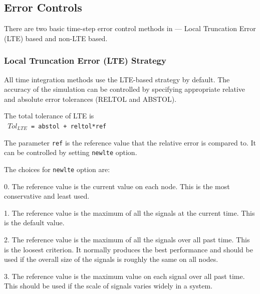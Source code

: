 \subsection{Error Controls}
\label{Time_Step_Selection}
  

There are two basic  time-step error control methods in \Xyce{} --- Local
Truncation Error (LTE) based and non-LTE based.  


\subsubsection{Local Truncation Error (LTE) Strategy}
 
All time integration methods use the LTE-based strategy by default. The
accuracy of the simulation can be controlled by specifying appropriate relative
and absolute error tolerances (RELTOL and ABSTOL).


The total tolerance of LTE is
{\\
\texttt{ $Tol_{LTE}$  = abstol +  reltol*ref}  
}

The parameter \verb|ref| is the reference value that the relative error is compared to. It can be controlled by setting \verb|newlte| option.

The  choices for \verb|newlte| option are:

\begin{XyceItemize} 
\item 0. The reference value is the current value on each node. This is the most conservative and least used.
\item 1. The reference value is the maximum of all the signals at the current time. This is the default value.
\item 2. The reference value is the maximum of all the signals over all past time. This is the loosest criterion. It normally produces the best performance and should be used if the overall size of the signals is roughly the same on all nodes.
\item 3. The reference value is the maximum value on each signal over all past time. This should be used if the scale of signals varies widely in a system.
\end{XyceItemize}


